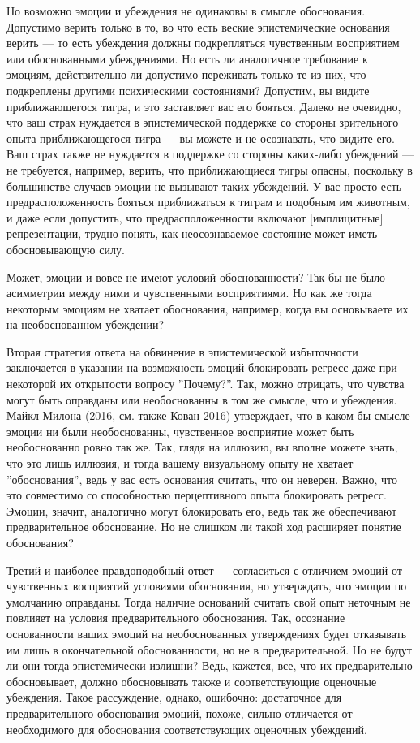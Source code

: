 \documentclass[11pt]{book}
\begin{document}
Но возможно эмоции и убеждения не одинаковы в смысле обоснования. Допустимо верить только в то, во что есть веские эпистемические основания верить --- то есть убеждения должны подкрепляться чувственным восприятием или обоснованными убеждениями. Но есть ли аналогичное требование к эмоциям, действительно ли допустимо переживать только те из них, что подкреплены другими психическими состояниями? Допустим, вы видите приближающегося тигра, и это заставляет вас его бояться. Далеко не очевидно, что ваш страх нуждается в эпистемической поддержке со стороны зрительного опыта приближающегося тигра --- вы можете и не осознавать, что видите его. Ваш страх также не нуждается в поддержке со стороны каких-либо убеждений --- не требуется, например, верить, что приближающиеся тигры опасны, поскольку в большинстве случаев эмоции не вызывают таких убеждений. У вас просто есть предрасположенность бояться приближаться к тиграм и подобным им животным, и даже если допустить, что предрасположенности включают [имплицитные] репрезентации, трудно понять, как неосознаваемое состояние может иметь обосновывающую силу.

Может, эмоции и вовсе не имеют условий обоснованности? Так бы не было асимметрии между ними и чувственными восприятиями. Но как же тогда некоторым эмоциям не хватает обоснования, например, когда вы основываете их на необоснованном убеждении?

Вторая стратегия ответа на обвинение в эпистемической избыточности заключается в указании на возможность эмоций блокировать регресс даже при некоторой их открытости вопросу ''Почему?''. Так, можно отрицать, что чувства могут быть оправданы или необоснованны в том же смысле, что и убеждения. Майкл Милона (2016, см. также Кован 2016) утверждает, что в каком бы смысле эмоции ни были необоснованны, чувственное восприятие может быть необоснованно ровно так же. Так, глядя на иллюзию, вы вполне можете знать, что это лишь иллюзия, и тогда вашему визуальному опыту не хватает ''обоснования'', ведь у вас есть основания считать, что он неверен. Важно, что это совместимо со способностью перцептивного опыта блокировать регресс. Эмоции, значит, аналогично могут блокировать его, ведь так же обеспечивают предварительное обоснование. Но не слишком ли такой ход расширяет понятие обоснования?

Третий и наиболее правдоподобный ответ --- согласиться с отличием эмоций от чувственных восприятий условиями обоснования, но утверждать, что эмоции по умолчанию оправданы. Тогда наличие оснований считать свой опыт неточным не повлияет на условия предварительного обоснования. Так, осознание основанности ваших эмоций на необоснованных утверждениях будет отказывать им лишь в окончательной обоснованности, но не в предварительной. Но не будут ли они тогда эпистемически излишни? Ведь, кажется, все, что их предварительно обосновывает, должно обосновывать также и соответствующие оценочные убеждения. Такое рассуждение, однако, ошибочно: достаточное для предварительного обоснования эмоций, похоже, сильно отличается от необходимого для обоснования соответствующих оценочных убеждений.
\end{document}

